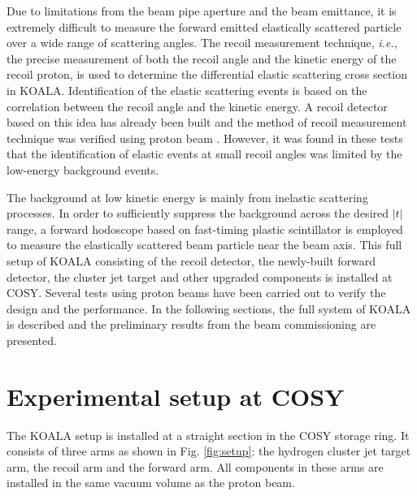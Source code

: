 \documentclass[number,5p]{elsarticle}
\begin{document}
Due to limitations from the beam pipe aperture and the beam emittance,
it is extremely difficult to measure the forward emitted elastically scattered particle over a wide range of scattering angles.
The recoil measurement technique, \textit{i.e.}, the precise measurement of both the recoil angle and the kinetic energy of the recoil proton, 
is used to determine the differential elastic scattering cross section in KOALA.
Identification of the elastic scattering events is based on the correlation between the recoil angle and the kinetic energy.
A recoil detector based on this idea has already been built and the method of
recoil measurement technique was verified using proton beam
\cite{koala_article,recoil_article}.
However, it was found in these tests that the identification of elastic events at small recoil angles was limited by the low-energy background events.

The background at low kinetic energy is mainly from inelastic scattering processes.
In order to sufficiently suppress the background across the desired $|t|$ range,
a forward hodoscope based on fast-timing plastic scintillator is
employed to measure the elastically scattered beam particle near the beam axis.
This full setup of KOALA consisting of the recoil detector, the newly-built
forward detector, the cluster jet target and other upgraded components is installed at COSY.
Several tests using proton beams have been carried out to verify the design and the performance.
In the following sections,  the full system of KOALA is described and the preliminary results from the beam commissioning are presented.

\section{Experimental setup at COSY}
\label{sec:setup}

The KOALA setup is installed at a straight section in the COSY storage ring.
It consists of three arms as shown in Fig. \ref{fig:setup}: the hydrogen
cluster jet target arm, the recoil arm and the forward arm.
All components in these arms are installed in the same vacuum volume as the
proton beam.
\end{document}
